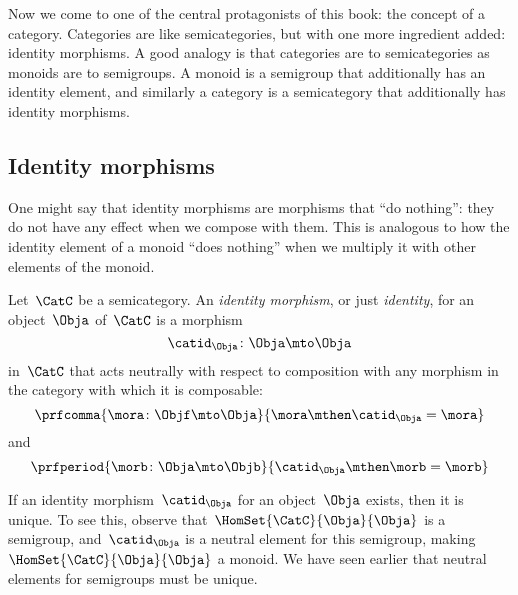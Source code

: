 Now we come to one of the central protagonists of this book: the concept of a category.
Categories are like semicategories, but with one more ingredient added: identity morphisms.
A good analogy is that categories are to semicategories as monoids are to semigroups.
A monoid is a semigroup that additionally has an identity element, and similarly a category is a semicategory that additionally has identity morphisms.

\subsection{Identity morphisms}

One might say that identity morphisms are morphisms that ``do nothing'': they do not have any effect when we compose with them.
This is analogous to how the identity element of a monoid ``does nothing'' when we multiply it with other elements of the monoid.

\begin{ctdefinition}
    \label{def:identity-morphism}
    Let~$\CatC$ be a semicategory.
    An \emph{identity morphism}, or just \emph{identity}, for an object~$\Obja$ of~$\CatC$ is a morphism
    \begin{equation}
        \catid_{\Obja} \colon \Obja \mto \Obja
    \end{equation}
    in~$\CatC$ that acts neutrally with respect to composition with any morphism in the category with which it is composable:
    \begin{equation}
        \prfcomma{
            \mora \colon \Objf \mto \Obja
        }{
            \mora \mthen \catid_\Obja = \mora
        }
    \end{equation}
    and
    \begin{equation}
        \prfperiod{
            \morb \colon \Obja \mto \Objb
        }{
            \catid_\Obja \mthen \morb = \morb
        }
    \end{equation}
\end{ctdefinition}

\begin{remark}
    If an identity morphism~$\catid_{\Obja}$ for an object~$\Obja$ exists, then it is unique.
    To see this, observe that~$\HomSet{\CatC}{\Obja}{\Obja}$ is a semigroup, and~$\catid_{\Obja}$ is a neutral element for this semigroup, making~$\HomSet{\CatC}{\Obja}{\Obja}$ a monoid.
    We have seen earlier that neutral elements for semigroups must be unique.
\end{remark}

